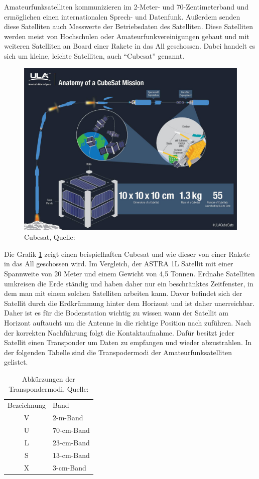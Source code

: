Amateurfunksatelliten kommunizieren im 2-Meter- und 70-Zentimeterband \cite{Wiki:amateur} und ermöglichen einen 
internationalen Sprech- und Datenfunk. Außerdem senden diese Satelliten
auch Messwerte der Betriebsdaten des Satelliten. Diese Satelliten werden meist von Hochschulen oder Amateurfunkvereinigungen gebaut und mit weiteren 
Satelliten an Board einer Rakete in das All geschossen. Dabei handelt es sich um kleine, leichte Satelliten, auch ``Cubesat'' genannt.
\clearpage
\begin{figure}[h]
 \centering
 \includegraphics[width=0.7\linewidth]{./images/cubesat}
 \caption{Cubesat, Quelle: \cite{cubesat}}
 \label{fig:cubesat}
\end{figure}
Die Grafik \ref{fig:cubesat} zeigt einen beispielhaften Cubesat und wie dieser von einer Rakete in 
das All geschossen wird. Im Vergleich, der ASTRA 1L Satellit mit 
einer Spannweite von 20 Meter und einem Gewicht von 4,5 Tonnen. Erdnahe Satelliten umkreisen die 
Erde ständig und haben daher nur ein beschränktes 
Zeitfenster, in dem man mit einem solchen Satelliten arbeiten kann. Davor befindet sich der Satellit durch die Erdkrümmung hinter dem Horizont und 
ist daher unerreichbar. Daher ist es für die Bodenstation wichtig zu wissen wann der Satellit am Horizont auftaucht um die Antenne in die richtige 
Position nach zuführen. Nach der korrekten Nachführung folgt die Kontaktaufnahme. Dafür besitzt jeder Satellit einen Transponder um Daten zu 
empfangen und wieder abzustrahlen. In der folgenden Tabelle sind die Transpodermodi der Amateurfunksatelliten gelistet. 
\begin{table}[h]
	\centering
	\caption[Abkürzungen der Transpondermodi]{Abkürzungen der Transpondermodi, Quelle: \cite{amateursat}}
	\begin{tabular}{c|l}
		Bezeichnung & Band\\ 
		V & 2-m-Band 	\\
		U & 70-cm-Band 	\\
		L & 23-cm-Band 	\\
		S & 13-cm-Band 	\\
		X & 3-cm-Band 	\\
	\end{tabular} 
	\label{tab:modi}
\end{table}

